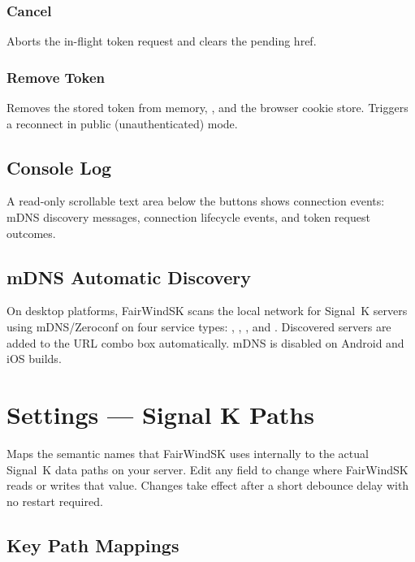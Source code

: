 \subsection{Cancel}

Aborts the in-flight token request and clears the pending href.

\subsection{Remove Token}

Removes the stored token from memory, , and the browser cookie store.
Triggers a reconnect in public (unauthenticated) mode.

\section{Console Log}

A read-only scrollable text area below the buttons shows connection events:
mDNS discovery messages, connection lifecycle events, and token request outcomes.

\section{mDNS Automatic Discovery}

On desktop platforms, FairWindSK scans the local network for Signal~K servers using
mDNS/Zeroconf on four service types:
, , ,
and .
Discovered servers are added to the URL combo box automatically.
mDNS is disabled on Android and iOS builds.

\chapter{Settings --- Signal K Paths}
\label{ch:settings-signalk}

Maps the semantic names that FairWindSK uses internally to the actual Signal~K data paths
on your server.
Edit any field to change where FairWindSK reads or writes that value.
Changes take effect after a short debounce delay with no restart required.


\section{Key Path Mappings}

